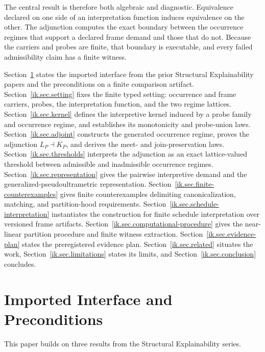 \documentclass[11pt]{article}
\theoremstyle{plain}
\theoremstyle{definition}
\theoremstyle{remark}
\begin{document}
The central result is therefore both algebraic and diagnostic.
Equivalence declared on one side of an interpretation function
induces equivalence on the other.
The adjunction computes the exact boundary
between the occurrence regimes
that support a declared frame demand and those that do not.
Because the carriers and probes are finite, that boundary is executable,
and every failed admissibility claim has a finite witness.

Section~\ref{ik.sec.interface} states the imported interface from the prior
Structural Explainability papers and the preconditions on a finite comparison
artifact.
Section~\ref{ik.sec.setting} fixes the finite typed setting: occurrence and
frame carriers, probes, the interpretation function, and the two regime lattices.
Section~\ref{ik.sec.kernel} defines the interpretive kernel induced by a probe
family and occurrence regime, and establishes its monotonicity and probe-union
laws.
Section~\ref{ik.sec.adjoint} constructs the generated occurrence regime, proves
the adjunction \(L_P\dashv K_P\), and derives the meet- and join-preservation
laws.
Section~\ref{ik.sec.thresholds} interprets the adjunction as an exact
lattice-valued threshold between admissible and inadmissible occurrence regimes.
Section~\ref{ik.sec.representation} gives the pairwise interpretive demand and
the generalized-pseudoultrametric representation.
Section~\ref{ik.sec.finite-counterexamples} gives finite counterexamples
delimiting canonicalization, matching, and partition-hood requirements.
Section~\ref{ik.sec.schedule-interpretation} instantiates the construction for
finite schedule interpretation over versioned frame artifacts.
Section~\ref{ik.sec.computational-procedure} gives the near-linear partition
procedure and finite witness extraction.
Section~\ref{ik.sec.evidence-plan} states the preregistered evidence plan.
Section~\ref{ik.sec.related} situates the work,
Section~\ref{ik.sec.limitations} states its limits, and
Section~\ref{ik.sec.conclusion} concludes.

\section{Imported Interface and Preconditions}
\label{ik.sec.interface}

This paper builds on three results from the Structural Explainability series.
\end{document}
